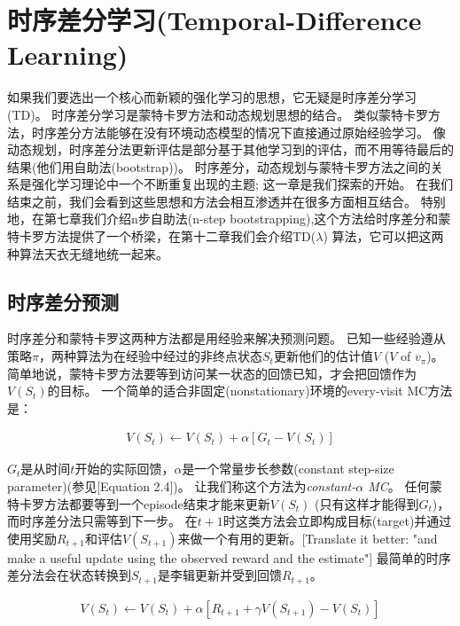 \documentclass{book}
\begin{document}


\chapter{时序差分学习(Temporal-Difference Learning)}
如果我们要选出一个核心而新颖的强化学习的思想，它无疑是时序差分学习(TD)。
时序差分学习是蒙特卡罗方法和动态规划思想的结合。
类似蒙特卡罗方法，时序差分方法能够在没有环境动态模型的情况下直接通过原始经验学习。
像动态规划，时序差分法更新评估是部分基于其他学习到的评估，而不用等待最后的结果(他们用自助法(bootstrap))。
时序差分，动态规划与蒙特卡罗方法之间的关系是强化学习理论中一个不断重复出现的主题; 这一章是我们探索的开始。
在我们结束之前，我们会看到这些思想和方法会相互渗透并在很多方面相互结合。
特别地，在第七章我们介绍n步自助法(n-step bootstrapping),这个方法给时序差分和蒙特卡罗方法提供了一个桥梁，在第十二章我们会介绍TD($\lambda$) 算法，它可以把这两种算法天衣无缝地统一起来。

\section{时序差分预测}
时序差分和蒙特卡罗这两种方法都是用经验来解决预测问题。
已知一些经验遵从策略$\pi$，两种算法为在经验中经过的非终点状态$S_t$更新他们的估计值$V$ ($V$ of $v_\pi$)。
简单地说，蒙特卡罗方法要等到访问某一状态的回馈已知，才会把回馈作为$V(S_t)$的目标。
一个简单的适合非固定(nonstationary)环境的every-visit MC方法是：

\begin{align}
	V(S_t) \leftarrow V(S_t) + \alpha[G_t - V(S_t)]
\end{align}

$G_t$是从时间$t$开始的实际回馈，$\alpha$是一个常量步长参数(constant step-size parameter)(参见[Equation 2.4])。
让我们称这个方法为\textit{constant-$\alpha$ MC}。
任何蒙特卡罗方法都要等到一个episode结束才能来更新$V(S_t)$ (只有这样才能得到$G_t$)，而时序差分法只需等到下一步。
在$t+1$时这类方法会立即构成目标(target)并通过使用奖励$R_{t+1}$和评估$V(S_{t+1})$来做一个有用的更新。[Translate it better: "and make a useful update using the observed reward and the estimate"]
最简单的时序差分法会在状态转换到$S_{t+1}$是李辑更新并受到回馈$R_{t+1}$。

\begin{align}
	V(S_t) \leftarrow V(S_t) + \alpha[R_{t+1} + \gamma V(S_{t+1}) - V(S_t)]
\end{align}
\end{document}
